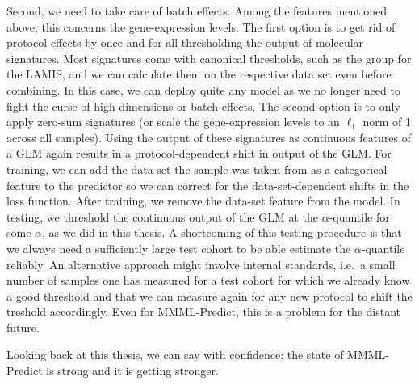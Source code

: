 Second, we need to take care of batch effects. Among the features mentioned above, this concerns 
the gene-expression levels. The first option is to get rid of protocol effects by once and for all
thresholding the output of molecular signatures. Most signatures come with canonical thresholds, 
such as the group for the LAMIS, and we can calculate them on the respective data set even before 
combining. In this case, we can deploy quite any model as we no longer need to fight the curse 
of high dimensions or batch effects. The second option is to only apply zero-sum signatures (or 
scale the gene-expression levels to an $\ell_1$ norm of \num{1} across all samples). Using the 
output of these signatures as continuous features of a GLM again results in a protocol-dependent 
shift in output of the GLM. For training, we can add the data set the sample was taken from as a 
categorical 
feature to the predictor so we can correct for the data-set-dependent shifts in the loss function. 
After training, we remove the data-set feature from the model. In testing, 
we threshold the continuous output of the GLM at the $\alpha$-quantile for some $\alpha$, as we did 
in this thesis. A shortcoming of this testing procedure is that we always need a sufficiently large 
test cohort to be able estimate the $\alpha$-quantile reliably. An alternative approach might 
involve internal standards, i.e.\ a small number of samples one has measured for a test cohort for 
which we already know a good threshold and that we can measure again for any new protocol to shift 
the treshold accordingly. Even for MMML-Predict, this is a problem for the distant future.

Looking back at this thesis, we can say with confidence: the state of MMML-Predict is strong and 
it is getting stronger.